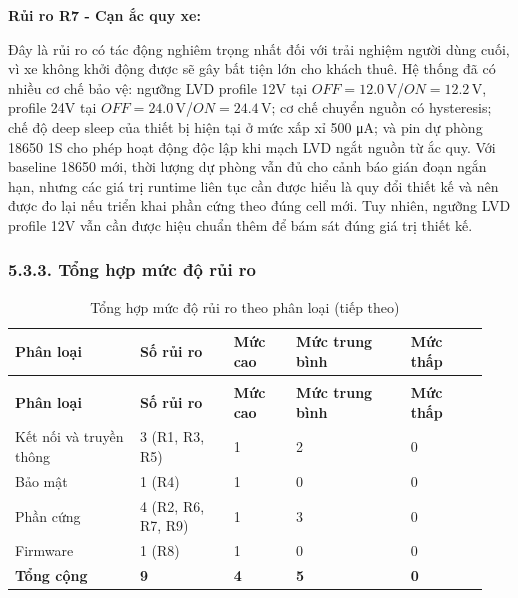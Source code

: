 \documentclass[a4paper]{extarticle}
\newcommand{\thesissettableid}[2]{%
  \renewcommand{\thetable}{#1}%
  \renewcommand{\theHtable}{#2}%
}
\begin{document}
\textbf{Rủi ro R7 - Cạn ắc quy xe:}

Đây là rủi ro có tác động nghiêm trọng nhất đối với trải nghiệm người
dùng cuối, vì xe không khởi động được sẽ gây bất tiện lớn cho khách
thuê. Hệ thống đã có nhiều cơ chế bảo vệ: ngưỡng LVD profile 12V tại
\(OFF = 12.0\,\mathrm{V}\)/\(ON = 12.2\,\mathrm{V}\), profile 24V tại
\(OFF = 24.0\,\mathrm{V}\)/\(ON = 24.4\,\mathrm{V}\); cơ chế chuyển
nguồn có hysteresis; chế độ deep sleep của thiết bị hiện tại ở mức xấp
xỉ 500 μA; và pin dự phòng 18650 1S cho phép hoạt động độc lập khi mạch
LVD ngắt nguồn từ ắc quy. Với baseline 18650 mới, thời lượng dự phòng
vẫn đủ cho cảnh báo gián đoạn ngắn hạn, nhưng các giá trị runtime liên
tục cần được hiểu là quy đổi thiết kế và nên được đo lại nếu triển khai
phần cứng theo đúng cell mới. Tuy nhiên, ngưỡng LVD profile 12V vẫn cần
được hiệu chuẩn thêm để bám sát đúng giá trị thiết kế.

\subsubsection{5.3.3. Tổng hợp mức độ rủi
ro}\label{533-tux1ed5ng-hux1ee3p-mux1ee9c-ux111ux1ed9-rux1ee7i-ro}


{\thesissettableid{5.9}{tab-ch5-tong-hop-muc-o-rui-ro-theo-phan-loai}
\def\LTcaptype{table}
\begin{longtable}{|L{0.249\linewidth}|L{0.189\linewidth}|L{0.125\linewidth}|L{0.229\linewidth}|L{0.153\linewidth}|}
\caption{Tổng hợp mức độ rủi ro theo phân loại}\label{tab:ch5-tong-hop-muc-o-rui-ro-theo-phan-loai}\\
\hline \textbf{Phân loại} & \textbf{Số rủi ro} & \textbf{Mức cao} & \textbf{Mức trung bình} & \textbf{Mức thấp} \\
\hline
\endfirsthead
\caption[]{Tổng hợp mức độ rủi ro theo phân loại (tiếp theo)}\\
\hline \textbf{Phân loại} & \textbf{Số rủi ro} & \textbf{Mức cao} & \textbf{Mức trung bình} & \textbf{Mức thấp} \\
\hline
\endhead
\hline
\endfoot
\endlastfoot
Kết nối và truyền thông & 3 (R1, R3, R5) & 1 & 2 & 0 \\\hline
Bảo mật & 1 (R4) & 1 & 0 & 0 \\\hline
Phần cứng & 4 (R2, R6, R7, R9) & 1 & 3 & 0 \\\hline
Firmware & 1 (R8) & 1 & 0 & 0 \\\hline
\textbf{Tổng cộng} & \textbf{9} & \textbf{4} & \textbf{5} &
\textbf{0} \\\hline
\end{longtable}
}
\end{document}
